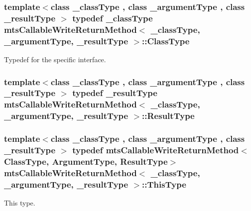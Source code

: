 \hypertarget{classmts_callable_write_return_method_a51dbe6298941ab172d83182c8188092d}{
\subsubsection[{Class\-Type}]{\setlength{\rightskip}{0pt plus 5cm}template$<$class \-\_\-class\-Type , class \-\_\-argument\-Type , class \-\_\-result\-Type $>$ typedef \-\_\-class\-Type {\bf mts\-Callable\-Write\-Return\-Method}$<$ \-\_\-class\-Type, \-\_\-argument\-Type, \-\_\-result\-Type $>$\-::{\bf Class\-Type}}}\label{classmts_callable_write_return_method_a51dbe6298941ab172d83182c8188092d}
Typedef for the specific interface. \hypertarget{classmts_callable_write_return_method_aad7815169b189d2f7a0e240ea134fd97}{
\subsubsection[{Result\-Type}]{\setlength{\rightskip}{0pt plus 5cm}template$<$class \-\_\-class\-Type , class \-\_\-argument\-Type , class \-\_\-result\-Type $>$ typedef \-\_\-result\-Type {\bf mts\-Callable\-Write\-Return\-Method}$<$ \-\_\-class\-Type, \-\_\-argument\-Type, \-\_\-result\-Type $>$\-::{\bf Result\-Type}}}\label{classmts_callable_write_return_method_aad7815169b189d2f7a0e240ea134fd97}
\hypertarget{classmts_callable_write_return_method_adc8a7a7a10c5aa9fe1e63b4e667c5d6c}{
\subsubsection[{This\-Type}]{\setlength{\rightskip}{0pt plus 5cm}template$<$class \-\_\-class\-Type , class \-\_\-argument\-Type , class \-\_\-result\-Type $>$ typedef {\bf mts\-Callable\-Write\-Return\-Method}$<${\bf Class\-Type}, {\bf Argument\-Type}, {\bf Result\-Type}$>$ {\bf mts\-Callable\-Write\-Return\-Method}$<$ \-\_\-class\-Type, \-\_\-argument\-Type, \-\_\-result\-Type $>$\-::{\bf This\-Type}}}\label{classmts_callable_write_return_method_adc8a7a7a10c5aa9fe1e63b4e667c5d6c}
This type. 

